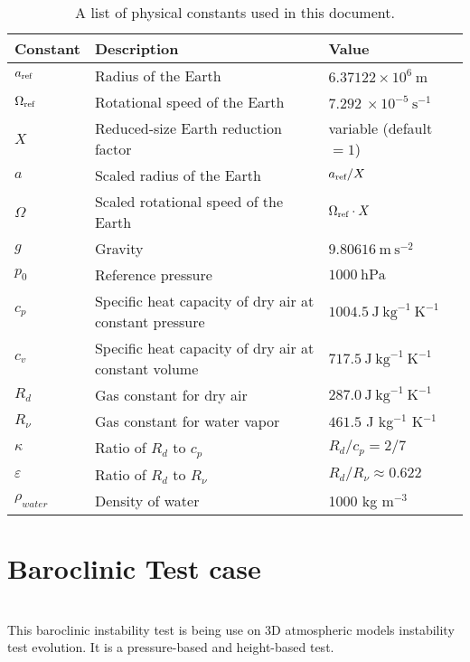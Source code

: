 \documentclass[times,doublespace]{fldauth}
\begin{document}
\begin{table}[h]
\caption{A list of physical constants used in this document.} \label{tab:PhysicalConstants}
\begin{tabular*}{\textwidth}{@{\extracolsep{\fill}}lll}
\hline Constant & Description & Value \\
\hline $a_{\tiny \mbox{ref}}$ & Radius of the Earth & $6.37122 \times 10^{6}\ \mbox{m}$ \\
$\Omega_{\tiny \mbox{ref}}$ & Rotational speed of the Earth & $7.292\ \times 10^{-5}\ \mbox{s}^{-1}$ \\
$X$ & Reduced-size Earth reduction factor & variable (default $= 1$) \\
$a$ & Scaled radius of the Earth & $a_{\tiny \mbox{ref}} / X$ \\
$\Omega$ & Scaled rotational speed of the Earth & $\Omega_{\tiny \mbox{ref}} \cdot X$ \\
$g$ & Gravity & $9.80616\ \mbox{m}\ \mbox{s}^{-2}$ \\
$p_0$ & Reference pressure & $1000\ \mbox{hPa}$ \\
$c_p$ & Specific heat capacity of dry air at constant pressure & $1004.5\ \mbox{J}\ \mbox{kg}^{-1}\ \mbox{K}^{-1}$ \\
$c_v$ & Specific heat capacity of dry air at constant volume & $717.5\ \mbox{J}\ \mbox{kg}^{-1}\ \mbox{K}^{-1}$ \\
$R_d$ & Gas constant for dry air & $287.0\ \mbox{J}\ \mbox{kg}^{-1}\ \mbox{K}^{-1}$ \\
$R_\nu$ & Gas constant for water vapor & $461.5$ J kg$^{-1}$ K$^{-1}$ \\
$\kappa$ & Ratio of $R_d$ to $c_p$ & $R_d/c_p = 2/7$ \\
$\varepsilon$ & Ratio of $R_d$ to $R_\nu$ & $R_d/R_\nu \approx 0.622$ \\
$\rho_{water}$ & Density of water & 1000 kg m$^{-3}$ \\
\hline 
\end{tabular*}

\end{table}

\clearpage
\section{Baroclinic Test case}   
 


~\\ This baroclinic instability test is being use on 3D atmospheric models instability test evolution. It is a pressure-based and height-based test. 
\end{document}
